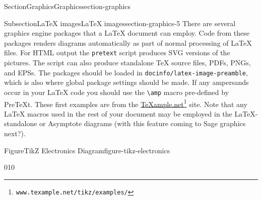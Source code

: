 \documentclass[twoside,10pt,]{article}
\newcommand{\mono}[1]{\texttt{#1}}
\numberwithin{equation}{section}
\begin{document}
\begin{sectionptx}{Section}{Graphics}{}{Graphics}{}{}{section-graphics}
\begin{subsectionptx}{Subsection}{\LaTeX{} images}{}{\LaTeX{} images}{}{}{section-graphics-5}
There are several graphics engine packages that a \LaTeX{} document can employ. Code from these packages renders diagrams automatically as part of normal processing of \LaTeX{} files.  For HTML output the \mono{pretext} script produces SVG versions of the pictures.  The script can also produce standalone \TeX{} source files, PDFs, PNGs, and EPSs. The packages should be loaded in \mono{docinfo/latex-image-preamble}, which is also where global package settings should be made. If any ampersands occur in your \LaTeX{} code you should use the \mono{\textbackslash{}amp} macro pre-defined by PreTeXt. These first examples are from the \href{http://www.texample.net/tikz/examples/}{TeXample.net}\footnote{\nolinkurl{www.texample.net/tikz/examples/}\label{section-graphics-5-4-10}} site.  Note that any \LaTeX{} macros used in the rest of your document may be employed in the \LaTeX{}-standalone or Asymptote diagrams (with this feature coming to Sage graphics next?).%
\begin{figureptx}{Figure}{TikZ Electronics Diagram}{figure-tikz-electronics}{}%
\begin{image}{0}{1}{0}{}%
\end{image}
\end{figureptx}
\end{subsectionptx}
\end{sectionptx}
\end{document}
